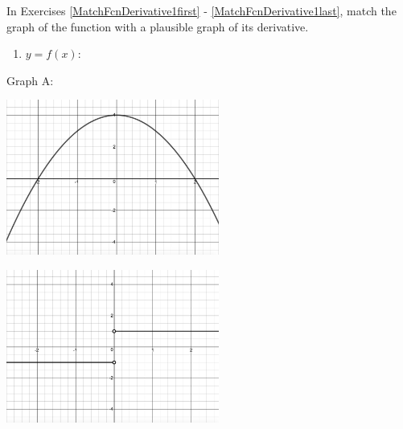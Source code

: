 \documentclass{ximera}
\begin{document}
In Exercises \ref{MatchFcnDerivative1first} - \ref{MatchFcnDerivative1last}, match the graph of the function with a plausible graph of its derivative.

\begin{center}

\begin{multicols}{2}

\begin{enumerate}
\setcounter{enumi}{\value{HW}}

\item \label{MatchFcnDerivative1first}$y = f(x)$:

\setcounter{HW}{\value{enumi}}
\end{enumerate}

Graph A:

\end{multicols}


\begin{multicols}{2}

\includegraphics[width=2.75in]{./IntroductiontoDerivativesGraphics/MatchFunc01.jpeg}

\includegraphics[width=2.75in]{./IntroductiontoDerivativesGraphics/MatchDeriv03.jpeg}

\end{multicols}



\begin{multicols}{2}

\begin{enumerate}
\setcounter{enumi}{\value{HW}}


\end{enumerate}
\end{multicols}
\end{center}
\end{document}
